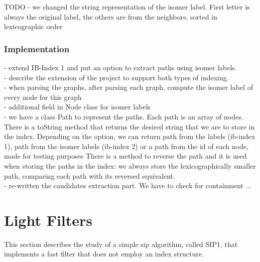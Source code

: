 \documentclass{l4proj}
\begin{document}
TODO
  - we changed the string representation of the isomer label. First letter is always the original label, the others are from the neighbors, sorted in lexicographic order\\

\subsection{Implementation}
       
       - extend IB-Index 1 and put an option to extract paths using isomer labels.\\
       - describe the extension of the project to support both types of indexing.\\
       - when parsing the graphs, after parsing each graph, compute the isomer label of every node for this graph\\
       - additional field in Node class for isomer labels\\
       - we have a class Path to represent the paths. Each path is an array of nodes. There is a toString method that returns the desired string that we are to store in the index. Depending on the option, we can return path from the labels (ib-index 1), path from the isomer labels (ib-index 2) or a path from the id of each node, made for testing purposes There is a method to reverse the path and it is used when storing the paths in the index: we always store the lexicographically smaller path, comparing each path with its reversed equivalent.\\
       - re-written the candidates extraction part. We have to check for containment ... \\

 
 
 

\chapter{Light Filters}
\label{ch:sip1}
This section describes the study of a simple \gls{sip} algorithm, called SIP1, that implements a fast filter that does not employ an index structure.
\end{document}
